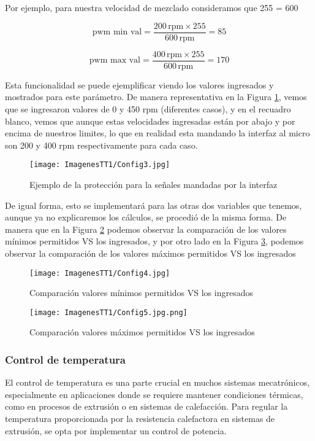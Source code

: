 \documentclass[14pt,oneside]{extarticle} %
\begin{document}
Por ejemplo, para nuestra velocidad de mezclado consideramos que 255 = 600 \, 

\[
\text{pwm min val} = \frac{200 \, \text{rpm} \times 255}{600 \, \text{rpm}} = 85
\]

\[
\text{pwm max val} = \frac{400 \, \text{rpm} \times 255}{600 \, \text{rpm}} = 170
\]

Esta funcionalidad se puede ejemplificar viendo los valores ingresados y mostrados para este parámetro. De manera representativa en la Figura \ref{fig:Config3}, vemos que se ingresaron valores de 0 y 450 rpm (diferentes casos), y en el recuadro blanco, vemos que aunque estas velocidades ingresadas están por abajo y por encima de nuestros limites, lo que en realidad esta mandando la interfaz al micro son 200 y 400 rpm respectivamente para cada caso. 

\begin{figure}[H]
    \centering
    \texttt{[image: ImagenesTT1/Config3.jpg]}
    \caption{Ejemplo de la protección para la señales mandadas por la interfaz}
    \label{fig:Config3}
\end{figure}

De igual forma, esto se implementará para las otras dos variables que tenemos, aunque ya no explicaremos los cálculos, se procedió de la misma forma. De manera que en la Figura \ref{fig:Config4} podemos observar la comparación de los valores mínimos permitidos VS los ingresados, y por otro lado en la Figura \ref{fig:Config5}, podemos observar la comparación de los valores máximos permitidos VS los ingresados

\begin{figure}[H]
    \centering
    \texttt{[image: ImagenesTT1/Config4.jpg]}
    \caption{Comparación valores mínimos permitidos VS los ingresados}
    \label{fig:Config4}
\end{figure}

\begin{figure}[H]
    \centering
    \texttt{[image: ImagenesTT1/Config5.jpg.png]}
    \caption{Comparación valores máximos permitidos VS los ingresados}
    \label{fig:Config5}
\end{figure}

\subsubsection{Control de temperatura}

El control de temperatura es una parte crucial en muchos sistemas mecatrónicos, especialmente en aplicaciones donde se requiere mantener condiciones térmicas, como en procesos de extrusión o en sistemas de calefacción. Para regular la temperatura proporcionada por la resistencia calefactora en sistemas de extrusión, se opta por implementar un control de potencia. 
\end{document}

